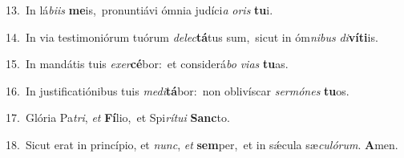 {\numbfont\textcolor{\numbcolor}{13.}}~In lá\-\textit{bi}\-\textit{is} \textbf{me}\-is,~\star pronuntiávi ómnia judíci\textit{a} \textit{o}\-\textit{ris} \textbf{tu}\-i.\par
{\numbfont\textcolor{\numbcolor}{14.}}~In via testimoniórum tuórum \textit{de}\-\textit{lec}\textbf{tá}tus sum,~\star sicut in óm\-\textit{ni}\-\textit{bus} \textit{di}\-\textbf{ví}\textbf{ti}is.\par
{\numbfont\textcolor{\numbcolor}{15.}}~In mandátis tuis \textit{ex}\-\textit{er}\textbf{cé}bor:~\star et considerá\textit{bo} \textit{vi}\-\textit{as} \textbf{tu}\-as.\par
{\numbfont\textcolor{\numbcolor}{16.}}~In justificatiónibus tuis \textit{me}\-\textit{di}\textbf{tá}bor:~\star non oblivíscar \textit{ser}\-\textit{mó}\textit{nes} \textbf{tu}\-os.\par
{\numbfont\textcolor{\numbcolor}{17.}}~Glória Pa\-\textit{tri}\-, \textit{et} \textbf{Fí}\-lio,~\star et Spi\-\textit{rí}\-\textit{tu}\textit{i} \textbf{Sanc}\-to.\par
{\numbfont\textcolor{\numbcolor}{18.}}~Sicut erat in princípio, et \textit{nunc}\-, \textit{et} \textbf{sem}\-per,~\star et in sǽcula sæ\-\textit{cu}\-\textit{ló}\textit{rum}. \textbf{A}\-men.\par
